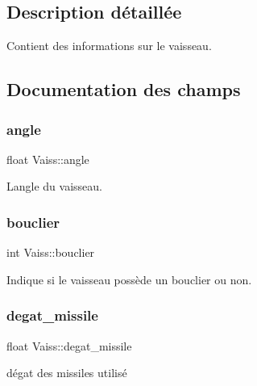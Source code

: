 \subsection{Description détaillée}
Contient des informations sur le vaisseau. 

\subsection{Documentation des champs}
\mbox{\label{struct_vaiss_a825b3dfd9664c59cdedcb03c868c23df}} 
\subsubsection{\texorpdfstring{angle}{angle}}
{\footnotesize\ttfamily float Vaiss\+::angle}



L\textquotesingle{}angle du vaisseau\textquotesingle{}. 

\mbox{\label{struct_vaiss_abccb7ae50f5a9e2ac6bb3c55d95e89eb}} 
\subsubsection{\texorpdfstring{bouclier}{bouclier}}
{\footnotesize\ttfamily int Vaiss\+::bouclier}



Indique si le vaisseau possède un bouclier ou non. 

\mbox{\label{struct_vaiss_aac3dfe507a9390c8e409296fc655457e}} 
\subsubsection{\texorpdfstring{degat\+\_\+missile}{degat\_missile}}
{\footnotesize\ttfamily float Vaiss\+::degat\+\_\+missile}



dégat des missiles utilisé 

\mbox{\label{struct_vaiss_a06e5d929598d839bd61673f0c56f1684}} 
